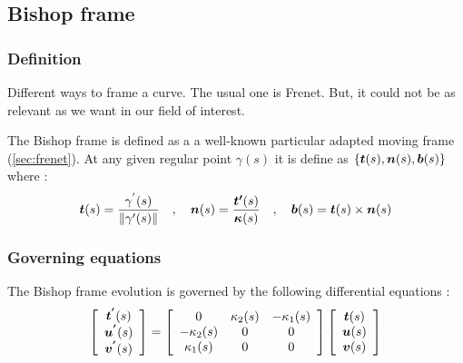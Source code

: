 
\subsection{Bishop frame}

\subsubsection{Definition}
Different ways to frame a curve. The usual one is Frenet. But, it could not be as relevant as we want in our field of interest.

The Bishop frame is defined as a a well-known particular adapted moving frame (\autoref{sec:frenet}). At any given regular point $\gamma(s)$ it is define as $\{\boldsymbol{t}(s),\boldsymbol{n}(s),\boldsymbol{b}(s)\}$ where :
\begin{gather}
\boldsymbol{t}(s) = \frac{\gamma^{'}(s)}{\|\gamma'(s)\|}
\quad,\quad
\boldsymbol{n}(s) = \frac{\boldsymbol{t'}(s)}{\boldsymbol{\kappa}(s)}
\quad,\quad
\boldsymbol{b}(s)= \boldsymbol{t}(s)\times\boldsymbol{n}(s)
\end{gather}

\subsubsection{Governing equations}
The Bishop frame evolution is governed by the following differential equations :
\begin{gather}
\left[\begin{array}{c}
\boldsymbol{t^{'}}(s) \\
\boldsymbol{u^{'}}(s) \\
\boldsymbol{v^{'}}(s)
\end{array}\right]
=
\left[\begin{array}{ccc}
0 & \kappa_{2}(s) & -\kappa_{1}(s) \\
-\kappa_{2}(s) & 0 & 0 \\
\kappa_{1}(s) & 0 & 0
\end{array}\right]
\left[\begin{array}{c}
\boldsymbol{t}(s) \\
\boldsymbol{u}(s) \\
\boldsymbol{v}(s)
\end{array}\right]
\end{gather}

